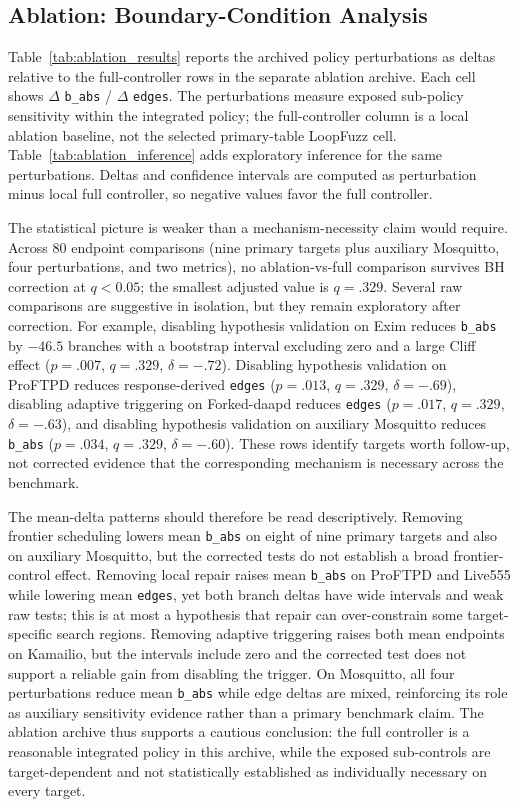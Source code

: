 \documentclass[final,5p,times,number]{elsarticle}
\begin{document}
\subsection{Ablation: Boundary-Condition Analysis}

Table~\ref{tab:ablation_results} reports the archived policy perturbations as deltas relative to the full-controller rows in the separate ablation archive. Each cell shows $\Delta$ \texttt{b\_abs} / $\Delta$ \texttt{edges}. The perturbations measure exposed sub-policy sensitivity within the integrated policy; the full-controller column is a local ablation baseline, not the selected primary-table LoopFuzz cell. Table~\ref{tab:ablation_inference} adds exploratory inference for the same perturbations. Deltas and confidence intervals are computed as perturbation minus local full controller, so negative values favor the full controller.

The statistical picture is weaker than a mechanism-necessity claim would require. Across 80 endpoint comparisons (nine primary targets plus auxiliary Mosquitto, four perturbations, and two metrics), no ablation-vs-full comparison survives BH correction at $q<0.05$; the smallest adjusted value is $q=.329$. Several raw comparisons are suggestive in isolation, but they remain exploratory after correction. For example, disabling hypothesis validation on Exim reduces \texttt{b\_abs} by $-46.5$ branches with a bootstrap interval excluding zero and a large Cliff effect ($p=.007$, $q=.329$, $\delta=-.72$). Disabling hypothesis validation on ProFTPD reduces response-derived \texttt{edges} ($p=.013$, $q=.329$, $\delta=-.69$), disabling adaptive triggering on Forked-daapd reduces \texttt{edges} ($p=.017$, $q=.329$, $\delta=-.63$), and disabling hypothesis validation on auxiliary Mosquitto reduces \texttt{b\_abs} ($p=.034$, $q=.329$, $\delta=-.60$). These rows identify targets worth follow-up, not corrected evidence that the corresponding mechanism is necessary across the benchmark.

The mean-delta patterns should therefore be read descriptively. Removing frontier scheduling lowers mean \texttt{b\_abs} on eight of nine primary targets and also on auxiliary Mosquitto, but the corrected tests do not establish a broad frontier-control effect. Removing local repair raises mean \texttt{b\_abs} on ProFTPD and Live555 while lowering mean \texttt{edges}, yet both branch deltas have wide intervals and weak raw tests; this is at most a hypothesis that repair can over-constrain some target-specific search regions. Removing adaptive triggering raises both mean endpoints on Kamailio, but the intervals include zero and the corrected test does not support a reliable gain from disabling the trigger. On Mosquitto, all four perturbations reduce mean \texttt{b\_abs} while edge deltas are mixed, reinforcing its role as auxiliary sensitivity evidence rather than a primary benchmark claim. The ablation archive thus supports a cautious conclusion: the full controller is a reasonable integrated policy in this archive, while the exposed sub-controls are target-dependent and not statistically established as individually necessary on every target.
\end{document}
